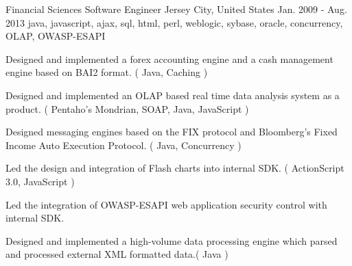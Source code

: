 \cventry
    {Financial Sciences} %
    {Software Engineer} %
    {Jersey City, United States} %
    {Jan. 2009 - Aug. 2013} %
    {java, javascript, ajax, sql, html, perl, weblogic, sybase, oracle, concurrency, OLAP, OWASP-ESAPI} %
    {
    \begin{cvitems} %
        \item { Designed and implemented a forex accounting engine and a cash management engine based on BAI2 format. ( Java, Caching )}
        \item { Designed and implemented an OLAP based real time data analysis system as a product. ( Pentaho's Mondrian, SOAP, Java, JavaScript )}
        \item { Designed messaging engines based on the FIX protocol and Bloomberg's Fixed Income Auto Execution Protocol. ( Java, Concurrency )}
        \item { Led the design and integration of Flash charts into internal SDK. ( ActionScript 3.0, JavaScript )}
        \item { Led the integration of OWASP-ESAPI web application security control with internal SDK.}
        \item { Designed and implemented a high-volume data processing engine which parsed and processed external XML formatted data.( Java )}
    \end{cvitems}
    }
    